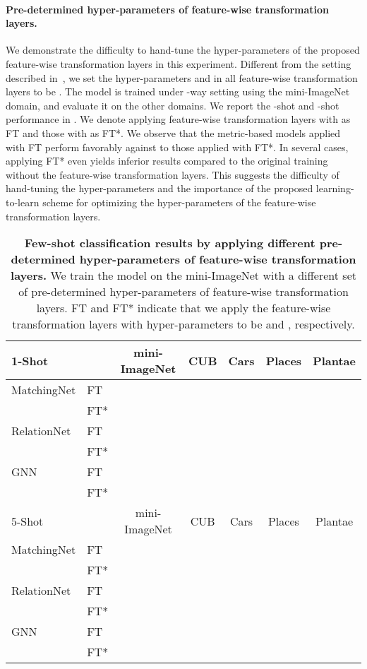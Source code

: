 \paragraph{Pre-determined hyper-parameters of feature-wise transformation layers.}
We demonstrate the difficulty to hand-tune the hyper-parameters of the proposed feature-wise transformation layers in this experiment.
Different from the setting described in~, we set the hyper-parameters  and  in all feature-wise transformation layers to be .
The model is trained under -way setting using the mini-ImageNet domain, and evaluate it on the other domains.
We report the -shot and -shot performance in .
We denote applying feature-wise transformation layers with  as FT and those with  as FT*.
We observe that the metric-based models applied with FT perform favorably against to those applied with FT*.
In several cases, applying FT* even yields inferior results compared to the original training without the feature-wise transformation layers.
This suggests the difficulty of hand-tuning the hyper-parameters and the importance of the proposed learning-to-learn scheme for optimizing the hyper-parameters of the feature-wise transformation layers.

\begin{table}[t]\scriptsize
	\centering
	\caption{\textbf{Few-shot classification results by applying different pre-determined hyper-parameters of feature-wise transformation layers.} We train the model on the mini-ImageNet with a different set of pre-determined hyper-parameters of feature-wise transformation layers. FT and FT* indicate that we apply the feature-wise transformation layers with hyper-parameters  to be  and , respectively.}
	\begin{tabular}{@{}ll|c|cccc@{}} 
	    \toprule
	    1-Shot & & mini-ImageNet & CUB & Cars & Places & Plantae \\
		\midrule
		MatchingNet & FT &
		 &  &  &  & \\
		& FT* & 
 &  &  &  & \\
		\midrule
		RelationNet & FT & 
		 &  &  &  & \\
		& FT* & 
	     &  &  &  & \\
		\midrule
		GNN & FT &
		 &  &  &  & \\
		& FT* & 
		 &  &  &  & \\
	    \midrule
	    \midrule
		5-Shot & & mini-ImageNet & CUB & Cars & Places & Plantae \\
		\midrule
		MatchingNet & FT &
		 &  &  &  & \\
		& FT* & 
		 &  &  &  & \\
		\midrule
		RelationNet & FT &
		 &  &  &  & \\
		& FT* & 
	     &  &  &  & \\
		\midrule
		GNN & FT &
		 &  &  &  & \\
		& FT* & 
		 &  &  &  & \\
		\bottomrule 
	\end{tabular}
	\label{tab:handtune}
\end{table}

